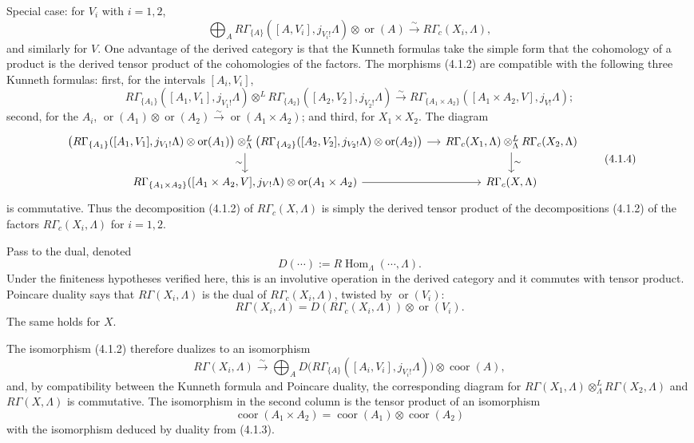 \documentclass[11pt]{article}
\theoremstyle{definition}
\newcommand{\Hom}{\operatorname{Hom}}
\newcommand{\ornt}{\operatorname{or}}
\newcommand{\coor}{\operatorname{coor}}
\begin{document}
Special case: for $V_i$ with $i=1,2$,
\begin{equation}
\bigoplus_A R\Gamma_{\{A\}}([A,V_i],j_{V_i!}\Lambda)\otimes\ornt(A)\xrightarrow{\sim}R\Gamma_c(X_i,\Lambda),\tag{4.1.2}
\end{equation}
and similarly for $V$.  One advantage of the derived category is that the Kunneth formulas take the simple form that the cohomology of a product is the derived tensor product of the cohomologies of the factors.  The morphisms (4.1.2) are compatible with the following three Kunneth formulas: first, for the intervals $[A_i,V_i]$,
\begin{equation}
R\Gamma_{\{A_1\}}([A_1,V_1],j_{V_1!}\Lambda)\otimes^L R\Gamma_{\{A_2\}}([A_2,V_2],j_{V_2!}\Lambda)
\xrightarrow{\sim}R\Gamma_{\{A_1\times A_2\}}([A_1\times A_2,V],j_{V!}\Lambda);\tag{4.1.3}
\end{equation}
second, for the $A_i$, $\ornt(A_1)\otimes\ornt(A_2)\xrightarrow{\sim}\ornt(A_1\times A_2)$; and third, for $X_1\times X_2$.  The diagram
\begin{equation}
\begin{tikzcd}[column sep=small]
\left(R\Gamma_{\{A_1\}}([A_1,V_1],j_{V_1!}\Lambda)\otimes\ornt(A_1)\right)
\otimes^L_\Lambda
\left(R\Gamma_{\{A_2\}}([A_2,V_2],j_{V_2!}\Lambda)\otimes\ornt(A_2)\right)
\arrow[r]\arrow[d,"\sim"']
& R\Gamma_c(X_1,\Lambda)\otimes^L_\Lambda R\Gamma_c(X_2,\Lambda)\arrow[d,"\sim"]\\
R\Gamma_{\{A_1\times A_2\}}([A_1\times A_2,V],j_{V!}\Lambda)\otimes\ornt(A_1\times A_2)\arrow[r]
& R\Gamma_c(X,\Lambda)
\end{tikzcd}\tag{4.1.4}
\end{equation}
is commutative.  Thus the decomposition (4.1.2) of $R\Gamma_c(X,\Lambda)$ is simply the derived tensor product of the decompositions (4.1.2) of the factors $R\Gamma_c(X_i,\Lambda)$ for $i=1,2$.

Pass to the dual, denoted
\[
D(\cdots):=R\Hom_\Lambda(\cdots,\Lambda).
\]
Under the finiteness hypotheses verified here, this is an involutive operation in the derived category and it commutes with tensor product.  Poincare duality says that $R\Gamma(X_i,\Lambda)$ is the dual of $R\Gamma_c(X_i,\Lambda)$, twisted by $\ornt(V_i)$:
\[
R\Gamma(X_i,\Lambda)=D(R\Gamma_c(X_i,\Lambda))\otimes\ornt(V_i).
\]
The same holds for $X$.

The isomorphism (4.1.2) therefore dualizes to an isomorphism
\[
R\Gamma(X_i,\Lambda)\xrightarrow{\sim}\bigoplus_A D\bigl(R\Gamma_{\{A\}}([A_i,V_i],j_{V_i!}\Lambda)\bigr)\otimes\coor(A),
\]
and, by compatibility between the Kunneth formula and Poincare duality, the corresponding diagram for $R\Gamma(X_1,\Lambda)\otimes^L_\Lambda R\Gamma(X_2,\Lambda)$ and $R\Gamma(X,\Lambda)$ is commutative.  The isomorphism in the second column is the tensor product of an isomorphism
\[
\coor(A_1\times A_2)=\coor(A_1)\otimes\coor(A_2)
\]
with the isomorphism deduced by duality from (4.1.3).
\end{document}
